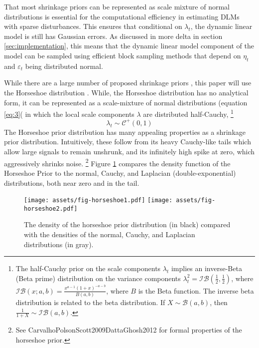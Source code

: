 \documentclass{article}
\newcommand{\dist}[1]{\mathcal{#1}}
\newcommand{\paren}[1]{\ensuremath{\left(#1\right)}}
\newcommand{\dhalfcauchy}[1]{\ensuremath{\dist{C}^{+}\paren{#1}}}
\newcommand{\dbeta}[1]{\ensuremath{\dist{B}\paren{#1}}}
\newcommand{\dinvbeta}[1]{\ensuremath{\dist{IB}\paren{#1}}}
\begin{document}
That most shrinkage priors can be represented as scale mixture of normal distributions is essential for the computational efficiency in estimating DLMs with sparse disturbances.
This ensures that conditional on $\lambda_{t}$, the dynamic linear model is still has Gaussian errors.
As discussed in more delta in section \ref{sec:implementation}, this means that the dynamic linear model component of the model can be sampled using efficient block sampling methods that depend on $\eta_{t}$ and $\varepsilon_{t}$ being distributed normal.

While there are a large number of proposed shrinkage priors \parencites{ArmaganDunsonLee2011}{BrownGriffin2010}{PolsonScott2010}, this paper will use the Horseshoe distribution \parencites{CarvalhoPolsonScott2009}{CarvalhoPolsonScott2010}{PolsonScott2010}{PolsonScott2012}{DattaGhosh2012}.
While, the Horseshoe distribution has no analytical form, it can be represented as a scale-mixture of normal distributions (equation \eqref{eq:3}( in which the local scale components $\lambda$ are distributed half-Cauchy,%
\footnote{
The half-Cauchy prior on the scale components $\lambda_{t}$ implies an inverse-Beta (Beta prime) distribution on the variance components $\lambda_{t}^{2} = \dinvbeta{\frac{1}{2}, \frac{1}{2}}$, where $\dinvbeta{x; a, b} = \frac{x^{a - 1} (1 + x)^{-a - b}}{B(a, b)}$, where $B$ is the Beta function.
The inverse beta distribution is related to the beta distribution.
If $X \sim \dbeta{a, b}$, then $\frac{1}{1 + X} \sim \dinvbeta{a, b}$.
}
\begin{equation}
  \label{eq:6}
  \lambda_{t} \sim \dhalfcauchy{0, 1}
\end{equation}
The Horseshoe prior distribution has many appealing properties as a shrinkage prior distribution.
Intuitively, these follow from its heavy Cauchy-like tails which allow large signals to remain unshrunk, and its infinitely high spike at zero, which aggressively shrinks noise.
\footnote{See \textcite{CarvalhoPolsonScott2010}{CarvalhoPolsonScott2009}{DattaGhosh2012} for formal properties of the horseshoe prior.}
Figure \ref{fig:horseshoe} compares the density function of the Horseshoe Prior to the normal, Cauchy, and Laplacian (double-exponential) distributions, both near zero and in the tail.
\begin{figure}
  \centering
  \texttt{[image: assets/fig-horseshoe1.pdf]}
  \texttt{[image: assets/fig-horseshoe2.pdf]}
  \caption{The density of the horseshoe prior distribution (in black) compared with the densities of the normal, Cauchy, and Laplacian distributions (in gray).}
  \label{fig:horseshoe}
\end{figure}
\end{document}
